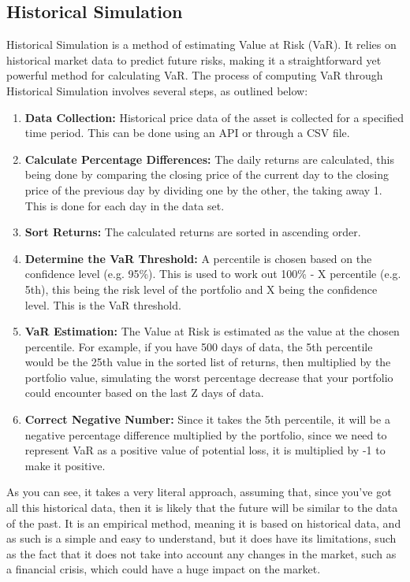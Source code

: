\documentclass{article}
\begin{document}
\subsection{Historical Simulation}

Historical Simulation is a method of estimating Value at Risk (VaR). It relies on historical market data to predict future risks, making it a straightforward yet powerful method for calculating VaR. The process of computing VaR through Historical Simulation involves several steps, as outlined below:

\begin{enumerate}
    \item \textbf{Data Collection:} Historical price data of the asset is collected for a specified time period. This can be done using an API or through a CSV file.
    \item \textbf{Calculate Percentage Differences:} The daily returns are calculated, this being done by comparing the closing price of the current day to the closing price of the previous day by dividing one by the other, the taking away 1. This is done for each day in the data set.
    \item \textbf{Sort Returns:} The calculated returns are sorted in ascending order.
    \item \textbf{Determine the VaR Threshold:} A percentile is chosen based on the confidence level (e.g. 95\%). This is used to work out 100\% - X percentile (e.g. 5th), this being the risk level of the portfolio and X being the confidence level. This is the VaR threshold.
    \item \textbf{VaR Estimation:} The Value at Risk is estimated as the value at the chosen percentile. For example, if you have 500 days of data, the 5th percentile would be the 25th value in the sorted list of returns, then multiplied by the portfolio value, simulating the worst percentage decrease that your portfolio could encounter based on the last Z days of data.
    \item \textbf{Correct Negative Number:} Since it takes the 5th percentile, it will be a negative percentage difference multiplied by the portfolio, since we need to represent VaR as a positive value of potential loss, it is multiplied by -1 to make it positive.
\end{enumerate}

As you can see, it takes a very literal approach, assuming that, since you've got all this historical data, then it is likely that the future will be similar to the data of the past. It is an empirical method, meaning it is based on historical data, and as such is a simple and easy to understand, but it does have its limitations, such as the fact that it does not take into account any changes in the market, such as a financial crisis, which could have a huge impact on the market.\\\vspace{0.3cm}
\end{document}
